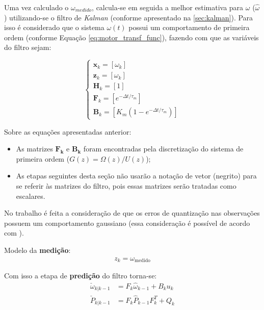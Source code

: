 Uma vez calculado o $\omega_{medido}$, calcula-se em 
seguida a melhor estimativa para $\omega$ ($\hat{\omega}$) 
utilizando-se o filtro de \emph{Kalman} (conforme apresentado na \autoref{sec:kalman}). 
Para isso é considerado que o sistema $\omega(t)$ possui um comportamento de primeira ordem 
(conforme Equação \ref{eq:motor_transf_func}), fazendo com que as variáveis do filtro sejam:

\begin{equation*}
\begin{cases}
    \bm{x}_k = \left[ \omega_k \right]\\
    \bm{z}_k = [\omega_k]\\
    \bm{H}_k = [1]\\
    \bm{F}_k = [e^{-\Delta{t}/\tau_{m}}]\\
    \bm{B}_k = [K_{m}(1 - e^{-\Delta{t}/\tau_{m}})]
\end{cases}
\end{equation*}

Sobre as equações apresentadas anterior: 
\begin{itemize}
    \item As matrizes $\bm{F_k}$ e $\bm{B_k}$ foram encontradas pela discretização do sistema de primeira ordem ($G(z) = \Omega(z)/U(z)$);
    \item As etapas seguintes desta seção não usarão a notação de vetor (negrito) para se referir às matrizes do filtro, pois essas matrizes serão tratadas como escalares.
\end{itemize}

No trabalho é feita a consideração de que os erros de quantização nas observações possuem um comportamento gaussiano (essa consideração é possível de acordo com \cite{quantization_error_is_a_gaussian}).

Modelo da \textbf{medição}:
\begin{align*}
z_k = \omega_{\text{medido}}
\end{align*}

Com isso a etapa de \textbf{predição} do filtro torna-se:
\begin{align*}
    \check{\omega}_{k|k-1} &= F_k \hat{\omega}_{k-1} + B_{k} u_{k}\\
    \check{P}_{k|k-1} &= F_{k}\hat{P}_{k-1}F^T_k + Q_k
\end{align*}

